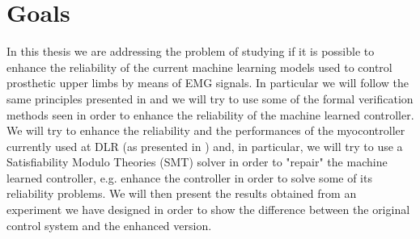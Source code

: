 \section{Goals}\label{sec:goals}
In this thesis we are addressing the problem of studying if it is possible to enhance the reliability of the current machine learning models used to control prosthetic upper limbs by means of EMG signals. 
In particular we will follow the same principles presented in \cite{leofante2018automated} and we will try to use some of the formal verification methods seen in order to enhance the reliability of the machine learned controller. We will try to enhance the reliability and the performances of the myocontroller currently used at DLR (as presented in \cite{Strazzulla2017}) and, in particular, we will try to use a Satisfiability Modulo Theories (SMT) solver in order to "repair" the machine learned controller, e.g. enhance the controller in order to solve some of its reliability problems.
We will then present the results obtained from an experiment we have designed in order to show the difference between the original control system and the enhanced version.